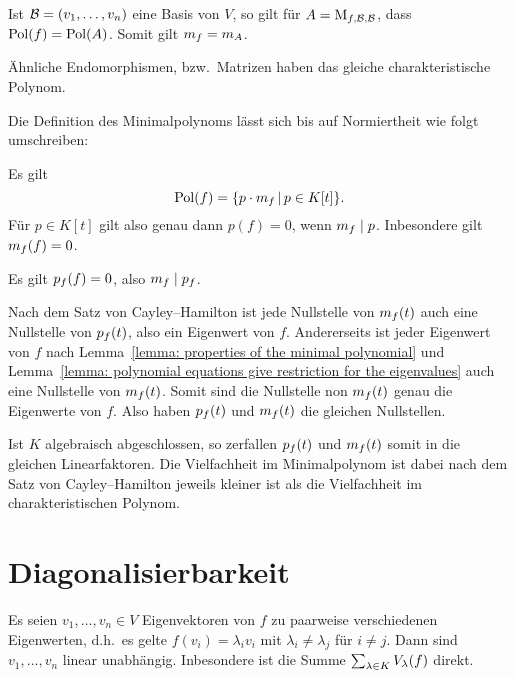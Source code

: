 \begin{lemma}
  Ist $\mathcal{B} = (v_1, \dotsc, v_n)$ eine Basis von $V$, so gilt für $A = \operatorname{M}_{f, \mathcal{B}, \mathcal{B}}$, dass $\operatorname{Pol}(f) = \operatorname{Pol}(A)$.
  Somit gilt $m_{f} = m_{A}$.
\end{lemma}

\begin{corollary}
  Ähnliche Endomorphismen, bzw.\ Matrizen haben das gleiche charakteristische Polynom.
\end{corollary}

Die Definition des Minimalpolynoms lässt sich bis auf Normiertheit wie folgt umschreiben:

\begin{lemma}
  \label{lemma: properties of the minimal polynomial}
  Es gilt
  \[
      \operatorname{Pol}(f)
    = \{ p \cdot m_{f} \,|\, p \in K[t] \}.
  \]
  Für $p \in K[t]$ gilt also genau dann $p(f) = 0$, wenn $m_{f} \mid p$.
  Inbesondere gilt $m_{f}(f) = 0$.
\end{lemma}

\begin{theorem}
  Es gilt $p_{f}(f) = 0$, also $m_{f} \mid p_{f}$.
\end{theorem}

Nach dem Satz von Cayley--Hamilton ist jede Nullstelle von $m_{f}(t)$ auch eine Nullstelle von $p_{f}(t)$, also ein Eigenwert von $f$.
Andererseits ist jeder Eigenwert von $f$ nach Lemma~\ref{lemma: properties of the minimal polynomial} und Lemma~\ref{lemma: polynomial equations give restriction for the eigenvalues} auch eine Nullstelle von $m_{f}(t)$.
Somit sind die Nullstelle non $m_{f}(t)$ genau die Eigenwerte von $f$.
Also haben $p_{f}(t)$ und $m_{f}(t)$ die gleichen Nullstellen.

Ist $K$ algebraisch abgeschlossen, so zerfallen $p_{f}(t)$ und $m_{f}(t)$ somit in die gleichen Linearfaktoren.
Die Vielfachheit im Minimalpolynom ist dabei nach dem Satz von Cayley--Hamilton jeweils kleiner ist als die Vielfachheit im charakteristischen Polynom.





\section{Diagonalisierbarkeit}

\begin{lemma}
  \label{lemma: linear independence of eigenvectors}
  Es seien $v_1, \dotsc, v_n \in V$ Eigenvektoren von $f$ zu paarweise verschiedenen Eigenwerten, d.h.\ es gelte $f(v_i) = \lambda_i v_i$ mit $\lambda_i \neq \lambda_j$ für $i \neq j$.
  Dann sind $v_1, \dotsc, v_n$ linear unabhängig.
  Inbesondere ist die Summe $\sum_{\lambda \in K} V_{\lambda}(f)$ direkt.
\end{lemma}

